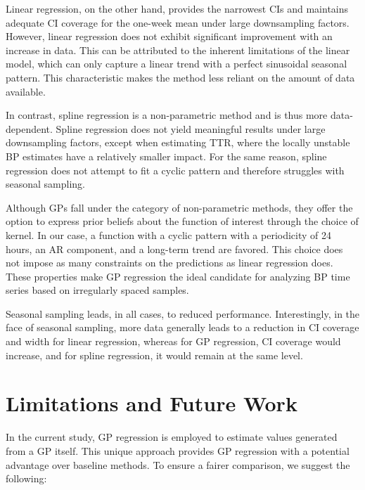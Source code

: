 Linear regression, on the other hand, provides the narrowest CIs and maintains adequate
CI coverage for the one-week mean under large downsampling factors. However,
linear regression does not exhibit significant improvement with an increase in data.
This can be attributed to the inherent
limitations of the linear model, which can only capture a linear trend with a perfect sinusoidal
seasonal pattern. This characteristic makes the method less reliant on the amount of data available.

In contrast, spline regression is a non-parametric method and is thus more data-dependent.
Spline regression does not yield meaningful results under large downsampling factors,
except when estimating TTR, where the locally unstable BP estimates have a relatively smaller impact.
For the same reason, spline regression does not attempt to fit a cyclic pattern and therefore struggles with seasonal sampling.

Although GPs fall under the category of non-parametric methods, they offer the option to express
prior beliefs about the function of interest through the choice of kernel.
In our case, a function with a cyclic pattern with a periodicity of 24 hours, an AR component, and a long-term trend are favored.
This choice does not impose as many constraints on the predictions as linear regression does.
These properties make GP regression the ideal candidate for analyzing BP time series based on irregularly spaced samples.

Seasonal sampling leads, in all cases, to reduced performance.
Interestingly, in the face of seasonal sampling, more data generally leads to
a reduction in CI coverage and width for linear regression,
whereas for GP regression, CI coverage would increase,
and for spline regression, it would remain at the same level.


\section{Limitations and Future Work}

In the current study, GP regression is employed to estimate values generated from a GP itself.
This unique approach provides GP regression with a potential advantage over baseline methods.
To ensure a fairer comparison, we suggest the following:

